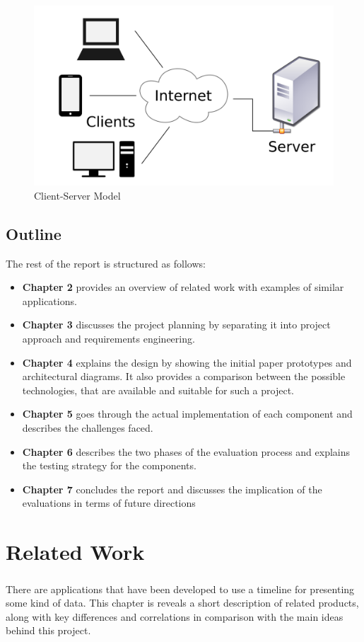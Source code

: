 \documentclass{l4proj}
\begin{document}
\begin{figure}[H]
	\centering
	\includegraphics[width=.5\textwidth]{images/clientserver}
	\caption{Client-Server Model}
	\label{fig:clientserver}
\end{figure} 

\section{Outline}
The rest of the report is structured as follows:
\begin{itemize}
	\item \textbf{Chapter 2} provides an overview of related work with examples of similar applications.
	
	\item \textbf{Chapter 3} discusses the project planning by separating it into project approach and requirements engineering.
	\item \textbf{Chapter 4} explains the design by showing the initial paper prototypes and architectural diagrams. It also provides a comparison between the possible technologies, that are available and suitable for such a project.
	\item \textbf{Chapter 5} goes through the actual implementation of each component and describes the challenges faced. 
	\item \textbf{Chapter 6} describes the two phases of the evaluation process and explains the testing strategy for the components.
	\item \textbf{Chapter 7} concludes the report and discusses the implication of the evaluations in terms of future directions
\end{itemize}


\chapter{Related Work}
\paragraph{}
There are applications that have been developed to use a timeline for presenting some kind of data. This chapter is reveals a short description of related products, along with key differences and correlations in comparison with the main ideas behind this project.  
\end{document}
